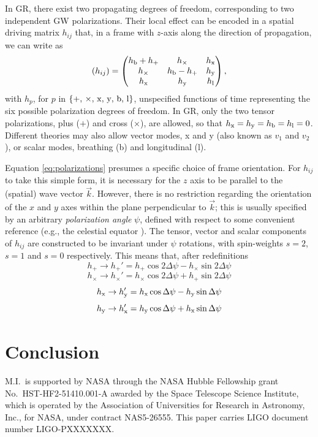 \documentclass[aps,prd,twocolumn,superscriptaddress,preprintnumbers,floatfix,nofootinbib]{revtex4-2}
\newcommand{\beq}{\begin{equation}}
\newcommand{\eeq}{\end{equation}}
\newcommand{\dcc}{LIGO-PXXXXXXX}
\begin{document}
In GR, there exist two propagating degrees of freedom, corresponding to two independent GW polarizations.
Their local effect can be encoded in a spatial driving matrix $h_{ij}$ that, in a frame with $z$-axis along the direction of propagation, we can write as
\beq \label{eq:polarizations}
(h_{ij}) = \begin{pmatrix}
\hb + h_+ & h_\times  & \hx  \\
h_\times  & \hb - h_+ & \hy  \\
\hx    & \hy    & \hlon
\end{pmatrix} ,
\eeq
with $h_p$, for $p$ in $\{+,\, \times,\, {\rm x},\, {\rm y},\, {\rm b},\, {\rm l}\}$, unspecified functions of time representing the six possible polarization degrees of freedom.
In GR, only the two tensor polarizations, plus ($+$) and cross ($\times$), are allowed, so that $h_{\rm x}=h_{\rm y}=h_{\rm b}=h_{\rm l}=0$.
Different theories may also allow vector modes, x and y (also known as $v_1$ and $v_2$), or scalar modes, breathing (b) and longitudinal (l).

Equation \eqref{eq:polarizations} presumes a specific choice of frame orientation.
For $h_{ij}$ to take this simple form, it is necessary for the $z$ axis to be parallel to the (spatial) wave vector $\vec{k}$.
However, there is no restriction regarding the orientation of the $x$ and $y$ axes within the plane perpendicular to $\vec{k}$; this is usually specified by an arbitrary \emph{polarization angle} $\psi$, defined with respect to some convenient reference (e.g., the celestial equator \cite{LALSuite:wave}).
The tensor, vector and scalar components of $h_{ij}$ are constructed to be invariant under $\psi$ rotations, with spin-weights $s=2$, $s=1$ and $s=0$ respectively.
This means that, after redefinitions
\beq
h_+ \rightarrow h_+' = h_+ \cos 2\Delta \psi - h_\times \sin 2\Delta\psi 
\eeq
\beq
h_\times \rightarrow h_\times' = h_\times \cos 2\Delta \psi + h_+ \sin 2\Delta\psi 
\eeq
\beq
\hx \rightarrow \hy' = \hx \cos \Delta \psi - \hy \sin \Delta\psi 
\eeq
\beq
\hy \rightarrow \hx' = \hy \cos \Delta \psi + \hx \sin \Delta\psi 
\eeq

\section{Conclusion}

\begin{acknowledgments}
M.I.\ is supported by NASA through the NASA Hubble Fellowship
grant No.\ HST-HF2-51410.001-A awarded by the Space Telescope
Science Institute, which is operated by the Association of Universities
for Research in Astronomy, Inc., for NASA, under contract NAS5-26555.
This paper carries LIGO document number \dcc{}.
\end{acknowledgments}


\end{document}
